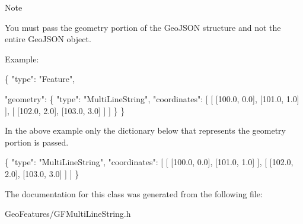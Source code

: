 \begin{DoxyNote}{Note}


You must pass the geometry portion of the Geo\+J\+S\+O\+N structure and not the entire Geo\+J\+S\+O\+N object.

Example\+:


\begin{DoxyCode}
\{
      \textcolor{stringliteral}{"type"}: \textcolor{stringliteral}{"Feature"},

      \textcolor{stringliteral}{"geometry"}: \{ \textcolor{stringliteral}{"type"}: \textcolor{stringliteral}{"MultiLineString"},
                    \textcolor{stringliteral}{"coordinates"}: [
                              [ [100.0, 0.0], [101.0, 1.0] ],
                              [ [102.0, 2.0], [103.0, 3.0] ]
                      ]
                  \}
 \}
\end{DoxyCode}


In the above example only the dictionary below that represents the geometry portion is passed.


\begin{DoxyCode}
\{
    \textcolor{stringliteral}{"type"}: \textcolor{stringliteral}{"MultiLineString"},
    \textcolor{stringliteral}{"coordinates"}: [
            [ [100.0, 0.0], [101.0, 1.0] ],
            [ [102.0, 2.0], [103.0, 3.0] ]
      ]
\}
\end{DoxyCode}
 
\end{DoxyNote}


The documentation for this class was generated from the following file\+:\begin{DoxyCompactItemize}
\item 
Geo\+Features/G\+F\+Multi\+Line\+String.\+h\end{DoxyCompactItemize}
